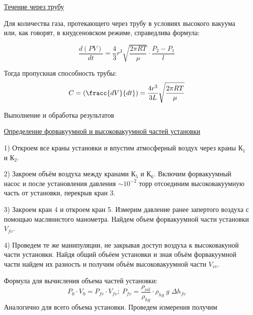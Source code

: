 \documentclass{article}
\begin{document}
\begin{center}
    \raggedleft
    {
        \large{\underline{Течение через трубу}}
    }
\end{center}

Для количества газа, протекающего через трубу в условиях высокого вакуума или, как говорят, в кнудсеновском режиме, справедлива формула:

\begin{equation}
    \frac{d(PV)}{dt} = \frac{4}{3} r^{3} \sqrt{\frac{2 \pi R T }{\mu}} \cdot \frac{P_{2} - P_{1}}{l}
\end{equation}

Тогда пропускная способность трубы:
\begin{equation}
    C = \left(\fracc{dV}{dt}\right) = \frac{4 r^{3}}{3 L} \sqrt{\frac{2 \pi R T }{\mu}}
\end{equation}


\begin{center}
    \raggedleft
    {
        \LARGE {Выполнение и обработка результатов}
    }
    \hline
    \hline
\end{center}

\begin{center}
    \raggedleft
    {
        \large{\underline{Определение форвакуумной и высоковакуумной частей установки}}
    }
\end{center}

1) Откроем все краны установки и впустим атмосферный воздух через краны К\(_{1}\) и К\(_{2}\).

2) Закроем объём воздуха  между кранами К\(_{5}\) и К\(_{6}\). Включим форвакуумный насос и после установления давления \(\sim 10^{-2}\) торр отсоединим высоковакуумную часть от установки, перекрыв кран 3.

3) Закроем кран 4 и откроем кран 5. Измерим давление ранее запертого воздуха с помощью маслянистого манометра. Найдем объем форвакуумной части установки \(V_{fv}\).

4) Проведем те же манипуляции, не закрывая доступ воздуха к высоковакуной части установки. Найдя общий объёем установки и зная объём форвакуумной части найдем их разность и получим объём высоковакуумной части \(V_{vv}\).

Формула для вычисления объема частей установки:
\begin{equation}
    P_{0}\cdot V_{0} = P_{fv} \cdot V_{fv} ; \;
    P_{fv} = \frac{\rho_{oil}}{\rho_{hg}} \cdot \rho_{hg}\;g\;\Delta h_{fv}
\end{equation}
Аналогично для всего объема установки. Проведем измерения получим
\end{document}
